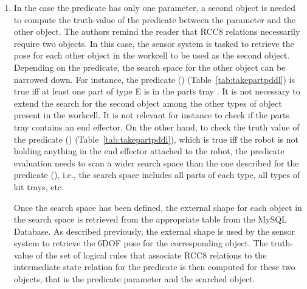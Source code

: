 \begin{enumerate}
\item In the case the predicate has only one parameter, a second object is needed to compute the truth-value of the predicate between the parameter and the other object. The authors remind the reader that RCC8 relations necessarily require two objects. In this case, the sensor system is tasked to retrieve the pose for each other object in the workcell to be used as the second object. Depending on the predicate, the search space for the other object can be narrowed down. For instance, the predicate () (Table~\ref{tab:takepartpddl}) is true iff at least one part of type E is in the parts tray . It is not necessary to extend the search for the second object among the other types of object present in the workcell. It is not relevant for instance to check if the parts tray contains an end effector. On the other hand, to check the truth value of the predicate () (Table~\ref{tab:takepartpddl}), which is true iff the robot  is not holding anything in the end effector attached to the robot, the predicate evaluation needs to scan a wider search space than the one described for the predicate (), i.e., the search space includes all parts of each type, all types of kit trays, etc.

Once the search space has been defined, the external shape for each object in the search space is retrieved from the appropriate table from the \textsf{MySQL Database}. As described previously, the external shape is used by the sensor system to retrieve the 6DOF pose for the corresponding object. The truth-value of the set of logical rules that associate RCC8 relations to the intermediate state relation for the predicate is then computed for these two objects, that is the predicate parameter and the searched object.
%


\end{enumerate}
